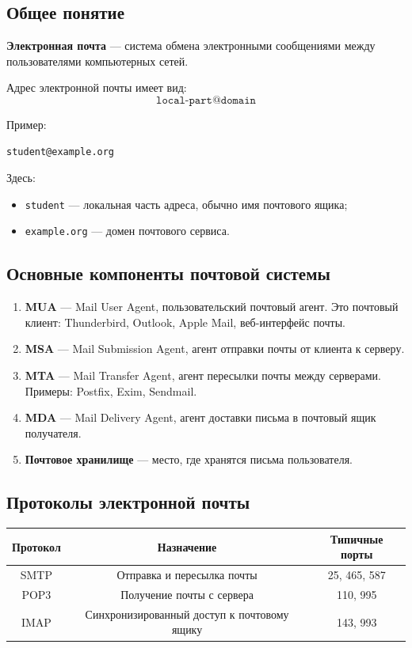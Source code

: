 \documentclass[12pt,a4paper]{article}
\begin{document}
\subsection{Общее понятие}

\textbf{Электронная почта} --- система обмена электронными сообщениями между пользователями компьютерных сетей.

Адрес электронной почты имеет вид:
\[
\texttt{local-part@domain}
\]

Пример:
\begin{lstlisting}
student@example.org
\end{lstlisting}

Здесь:
\begin{itemize}
    \item \texttt{student} --- локальная часть адреса, обычно имя почтового ящика;
    \item \texttt{example.org} --- домен почтового сервиса.
\end{itemize}

\subsection{Основные компоненты почтовой системы}

\begin{enumerate}
    \item \textbf{MUA} --- Mail User Agent, пользовательский почтовый агент. Это почтовый клиент: Thunderbird, Outlook, Apple Mail, веб-интерфейс почты.
    \item \textbf{MSA} --- Mail Submission Agent, агент отправки почты от клиента к серверу.
    \item \textbf{MTA} --- Mail Transfer Agent, агент пересылки почты между серверами. Примеры: Postfix, Exim, Sendmail.
    \item \textbf{MDA} --- Mail Delivery Agent, агент доставки письма в почтовый ящик получателя.
    \item \textbf{Почтовое хранилище} --- место, где хранятся письма пользователя.
\end{enumerate}

\subsection{Протоколы электронной почты}

\begin{center}
\begin{tabular}{|c|c|c|}
\hline
Протокол & Назначение & Типичные порты \\
\hline
SMTP & Отправка и пересылка почты & 25, 465, 587 \\
\hline
POP3 & Получение почты с сервера & 110, 995 \\
\hline
IMAP & Синхронизированный доступ к почтовому ящику & 143, 993 \\
\hline
\end{tabular}
\end{center}
\end{document}
